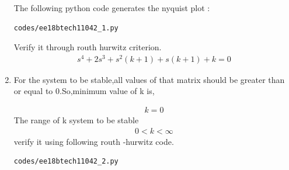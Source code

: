 \begin{enumerate}[label=\thesection.\arabic*.,ref=\thesection.\theenumi]
 The following python code generates the nyquist plot : 
\begin{lstlisting}
codes/ee18btech11042_1.py
\end{lstlisting}
Verify it through routh hurwitz criterion.  
\begin{align}
s^4+2s^3+s^2(k+1)+s(k+1)+k = 0
\label{eq:ee18btech11042_6}
\end{align}
\item 
     For the system to be stable,all values of that matrix should be greater than or equal to 0.So,minimum value of k is,


\begin{align}
k = 0
\label{eq:ee18btech11042_7}
\end{align}
The range of k system to be stable
\begin{align}
0<k<\infty
\label{eq:ee18btech11042_8}
\end{align}
verify it using following routh -hurwitz code.

\begin{lstlisting}
codes/ee18btech11042_2.py
\end{lstlisting}
\end{enumerate}